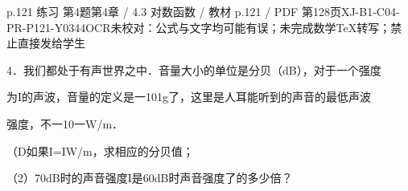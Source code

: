 \begin{bankitem}{p.121 练习 第4题}{第4章 / 4.3 对数函数 / 教材 p.121 / PDF 第128页}{XJ-B1-C04-PR-P121-Y0344}{OCR未校对：公式与文字均可能有误；未完成数学TeX转写；禁止直接发给学生}
\begin{ocrdraft}
\par
4．我们都处于有声世界之中．音量大小的单位是分贝（dB），对于一个强度
\par
为I的声波，音量的定义是一101g了，这里是人耳能听到的声音的最低声波
\par
强度，不一10一W/m．
\par
（D如果I=IW/m，求相应的分贝值；
\par
（2）70dB时的声音强度I是60dB时声音强度了的多少倍？
\end{ocrdraft}
\end{bankitem}
